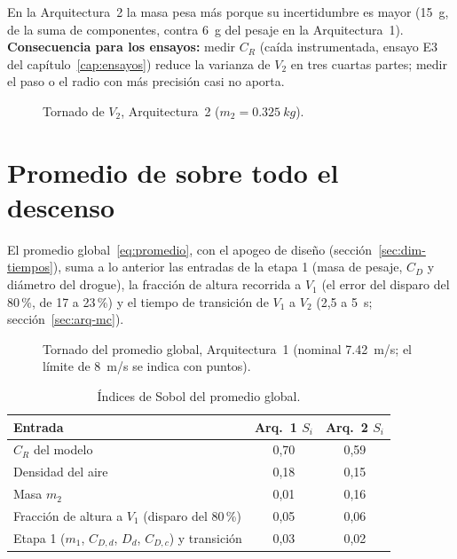 En la Arquitectura~2 la masa pesa más porque su incertidumbre es mayor (\SI{15}{g}, de la
suma de componentes, contra \SI{6}{g} del pesaje en la Arquitectura~1). \textbf{Consecuencia
para los ensayos:} medir $C_R$ (caída instrumentada, ensayo E3 del capítulo~\ref{cap:ensayos}) reduce la
varianza de $V_2$ en tres cuartas partes; medir el paso o el radio con más precisión casi no
aporta.

\begin{figure}[H]
\centering

\caption{Tornado de $V_2$, Arquitectura~2 ($m_2=\SI{0.325}{kg}$).}
\label{fig:sens-tornado-V2b}
\end{figure}

\section{Promedio de \texorpdfstring{}{C4} sobre todo el descenso}\label{sec:sens-Vg}

El promedio global~\eqref{eq:promedio}, con el apogeo de diseño (sección~\ref{sec:dim-tiempos}),
suma a lo anterior las entradas de la etapa 1 (masa de pesaje, $C_D$ y diámetro del drogue), la
fracción de altura recorrida a $V_1$ (el error del disparo del 80\,\%, de 17 a 23\,\%) y el
tiempo de transición de $V_1$ a $V_2$ (2,5 a \SI{5}{s}; sección~\ref{sec:arq-mc}).

\begin{figure}[H]
\centering

\caption{Tornado del promedio global, Arquitectura~1 (nominal \SI{7.42}{m/s}; el límite de
\SI{8}{m/s} se indica con puntos).}
\label{fig:sens-tornado-Vg}
\end{figure}

\begin{table}[H]
\centering\small
\caption{Índices de Sobol del promedio global.}\label{tab:sens-sobol-Vg}
\begin{tabular}{@{}lcc@{}}
\toprule
\textbf{Entrada} & \textbf{Arq.~1} $S_i$ & \textbf{Arq.~2} $S_i$\\\midrule
$C_R$ del modelo & 0,70 & 0,59\\
Densidad del aire & 0,18 & 0,15\\
Masa $m_2$ & 0,01 & 0,16\\
Fracción de altura a $V_1$ (disparo del 80\,\%) & 0,05 & 0,06\\
Etapa 1 ($m_1$, $C_{D,d}$, $D_d$, $C_{D,c}$) y transición & 0,03 & 0,02\\
\bottomrule
\end{tabular}
\end{table}

